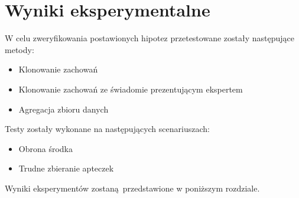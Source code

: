 \chapter{Wyniki eksperymentalne}

W celu zweryfikowania postawionych hipotez przetestowane zostały następujące metody:

\begin{itemize}
\item{Klonowanie zachowań}
\item{Klonowanie zachowań ze świadomie prezentującym ekspertem}
\item{Agregacja zbioru danych}
\end{itemize}

Testy zostały wykonane na następujących scenariuszach:

\begin{itemize}
\item{Obrona środka}
\item{Trudne zbieranie apteczek}
\end{itemize}

Wyniki eksperymentów zostaną przedstawione w poniższym rozdziale.









